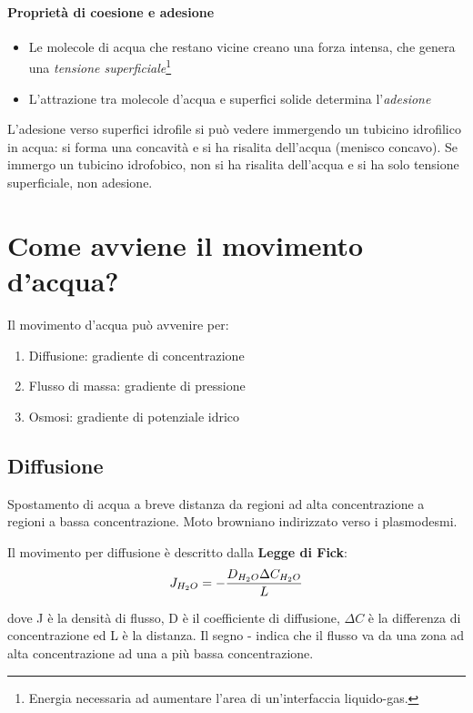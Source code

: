 \documentclass[a4paper,12pt]{book}
\begin{document}
\paragraph{Proprietà di coesione e adesione}

\begin{itemize}
\item{Le molecole di acqua che restano vicine creano una forza intensa, che genera una \emph{tensione superficiale}\footnote{Energia necessaria ad aumentare l'area di un'interfaccia liquido-gas.}}
\item{L'attrazione tra molecole d'acqua e superfici solide determina l'\emph{adesione}}
\end{itemize}

L'adesione verso superfici idrofile si può vedere immergendo un tubicino idrofilico in acqua: si forma una concavità e si ha risalita dell'acqua (menisco concavo). Se immergo un tubicino idrofobico, non si ha risalita dell'acqua e si ha solo tensione superficiale, non adesione.

\section{Come avviene il movimento d'acqua?}
Il movimento d'acqua può avvenire per:
\begin{enumerate}
\item{Diffusione: gradiente di concentrazione}
\item{Flusso di massa: gradiente di pressione}
\item{Osmosi: gradiente di potenziale idrico}
\end{enumerate}

\subsection{Diffusione}
Spostamento di acqua a breve distanza da regioni ad alta concentrazione a regioni a bassa  concentrazione. Moto browniano indirizzato verso i plasmodesmi.

Il movimento per diffusione è descritto dalla \textbf{Legge di Fick}:
\begin{equation}
J_{H_{2}O}=- \frac{D_{H_{2}O} \Delta C_{H_{2}O}}{L}
\centering
\end{equation}

dove J è la densità di flusso, D è il coefficiente di diffusione, $\Delta C$ è la differenza di concentrazione ed L è la distanza.
Il segno - indica che il flusso va da una zona ad alta concentrazione ad una a più bassa concentrazione.
\end{document}
